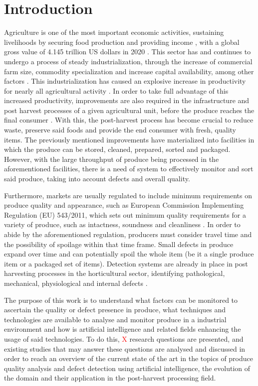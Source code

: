 \documentclass[conference]{IEEEtran}
\begin{document}
\section{Introduction}

Agriculture is one of the most important economic activities, sustaining livelihoods by securing food production and providing income \cite{FDES-1}, with a global gross value of 4.145 trillion US dollars in 2020 \cite{FAO1}. This sector has and continues to undergo a process of steady industrialization, through the increase of commercial farm size, commodity specialization and increase capital availability, among other factors \cite{10.2307/1243439}. This industrialization has caused an explosive increase in productivity for nearly all agricultural activity \cite{owidagriculturalproduction}. In order to take full advantage of this increased productivity, improvements are also required in the infrastructure and post harvest processes of a given agricultural unit, before the produce reaches the final consumer \cite{Food_and_Agriculture_Organization_of_the_United_Nations2010-hb}. With this, the post-harvest process has become crucial to reduce waste, preserve said foods and provide the end consumer with fresh, quality items. The previously mentioned improvements have materialized into facilities in which the produce can be stored, cleaned, prepared, sorted and packaged. However, with the large throughput of produce being processed in the aforementioned facilities, there is a need of system to effectively monitor and sort said produce, taking into account defects and overall quality.

Furthermore, markets are usually regulated to include minimum requirements on produce quality and appearance, such as European Commission Implementing Regulation (EU) 543/2011, which sets out minimum quality requirements for a variety of produce, such as intactness, soundness and cleanliness \cite{eu-5432011}. In order to abide by the aforementioned regulation, producers must consider travel time and the possibility of spoilage within that time frame. Small defects in produce expand over time and can potentially spoil the whole item (be it a single produce item or a packaged set of items). Detection systems are already in place in post harvesting processes in the horticultural sector, identifying pathological, mechanical, physiological and internal defects \cite{Nturambirwe2020}.

The purpose of this work is to understand what factors can be monitored to ascertain the quality or defect presence in produce, what techniques and technologies are available to analyse and monitor produce in a industrial environment and how is artificial intelligence and related fields enhancing the usage of said technologies. To do this, \textcolor{red}{X} research questions are presented, and existing studies that may answer these questions are analysed and discussed in order to reach an overview of the current state of the art in the topics of produce quality analysis and defect detection using artificial intelligence, the evolution of the domain and their application in the post-harvest processing field.
\end{document}
